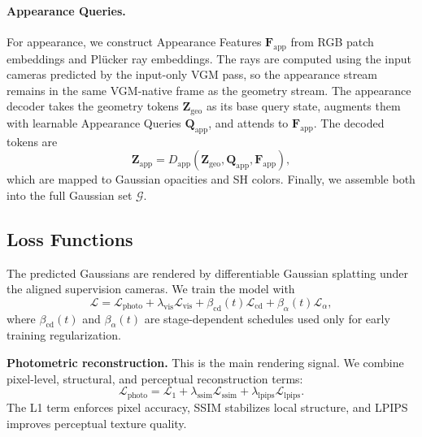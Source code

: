 \documentclass[letterpaper]{article} %
\begin{document}
\paragraph{Appearance Queries.}
For appearance, we construct Appearance Features $\mathbf{F}_{\mathrm{app}}$ from RGB patch embeddings and Pl\"ucker ray embeddings. The rays are computed using the input cameras predicted by the input-only VGM pass, so the appearance stream remains in the same VGM-native frame as the geometry stream. The appearance decoder takes the geometry tokens $\mathbf{Z}_{\mathrm{geo}}$ as its base query state, augments them with learnable Appearance Queries $\mathbf{Q}_{\mathrm{app}}$, and attends to $\mathbf{F}_{\mathrm{app}}$. The decoded tokens are
\begin{equation}
    \mathbf{Z}_{\mathrm{app}}
    =
    D_{\mathrm{app}}(\mathbf{Z}_{\mathrm{geo}},\mathbf{Q}_{\mathrm{app}},\mathbf{F}_{\mathrm{app}}),
\end{equation}
which are mapped to Gaussian opacities and SH colors. 
Finally, we assemble both into the full Gaussian set $\mathcal{G}$.





\subsection{Loss Functions}
\label{sec:objectives}

The predicted Gaussians are rendered by differentiable Gaussian splatting under the aligned supervision cameras. We train the model with
\begin{equation}
\label{eq:full_loss}
    \mathcal{L}
    =
    \mathcal{L}_{\mathrm{photo}}
    +
    \lambda_{\mathrm{vis}}\mathcal{L}_{\mathrm{vis}}
    +
    \beta_{\mathrm{cd}}(t)\mathcal{L}_{\mathrm{cd}}
    +
    \beta_{\alpha}(t)\mathcal{L}_{\alpha},
\end{equation}
where $\beta_{\mathrm{cd}}(t)$ and $\beta_{\alpha}(t)$ are stage-dependent schedules used only for early training regularization.

\noindent\textbf{Photometric reconstruction.}
This is the main rendering signal. We combine pixel-level, structural, and perceptual reconstruction terms:
\begin{equation}
    \mathcal{L}_{\mathrm{photo}}
    =
    \mathcal{L}_{1}
    +
    \lambda_{\mathrm{ssim}}\mathcal{L}_{\mathrm{ssim}}
    +
    \lambda_{\mathrm{lpips}}\mathcal{L}_{\mathrm{lpips}} .
\end{equation}
The L1 term enforces pixel accuracy, SSIM stabilizes local structure, and LPIPS improves perceptual texture quality.
\end{document}

